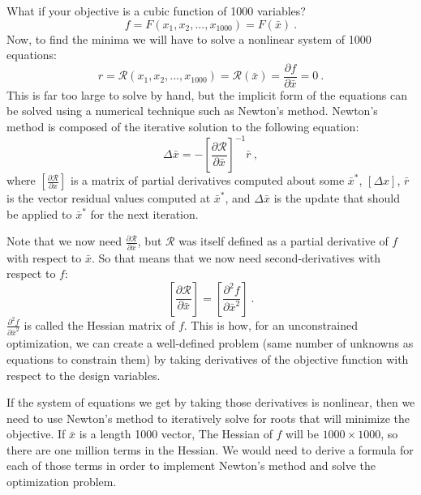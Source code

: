 \documentclass[conf]{new-aiaa}
\begin{document}
    What if your objective is a cubic function of 1000 variables? 
    \begin{equation}
        f = F(x_1,x_2, ..., x_{1000}) = F(\bar{x}) \ . 
    \end{equation}
    Now, to find the minima we will have to solve a nonlinear system of 1000 equations: 
    \begin{equation} 
    r = \mathcal{R}(x_1, x_2, ...,  x_{1000}) =  \mathcal{R}(\bar{x}) = \frac{\partial f}{\partial \bar{x}} =  0 \ . 
    \end{equation}
    This is far too large to solve by hand, but the implicit form of the equations can be solved using a numerical technique such as Newton's method. 
    Newton's method is composed of the iterative solution to the following equation: 
    \begin{equation}
         \Delta \bar{x} = - \left[\frac{\partial \mathcal{R}}{\partial \bar{x}} \right]^{-1} \bar{r} \ , 
    \end{equation}
    where $\left[\frac{\partial \mathcal{R}}{\partial x} \right]$ is a matrix of partial derivatives computed about some $\bar{x}^*$, $\left[\Delta x\right]$, $\bar{r}$ is the vector residual values computed at $\bar{x}^*$, and $\Delta \bar{x}$ is the update that should be applied to $\bar{x}^*$ for the next iteration. 

    Note that we now need $\frac{\partial \mathcal{R}}{\partial \bar{x}}$, but $\mathcal{R}$ was itself defined as a partial derivative of $f$ with respect to $\bar{x}$. 
    So that means that we now need second-derivatives with respect to $f$: 
    \begin{equation}
         \left[\frac{\partial \mathcal{R}}{\partial \bar{x}} \right] =  \left[\frac{\partial^2 f}{\partial \bar{x}^2} \right] \ . 
    \end{equation}
    $\frac{\partial^2 f}{\partial \bar{x}^2}$ is called the Hessian matrix of $f$.
    This is how, for an unconstrained optimization, we can create a well-defined problem (same number of unknowns as equations to constrain them) by taking derivatives of the objective function with respect to the design variables. 

    If the system of equations we get by taking those derivatives is nonlinear, then we need to use Newton's method to iteratively solve for roots that will minimize the objective.  
    If $\bar{x}$ is a length 1000 vector, The Hessian of $f$ will be $1000 \times 1000$, 
    so there are one million terms in the Hessian. 
    We would need to derive a formula for each of those terms in order to implement Newton's method and solve the optimization problem. 
\end{document}
